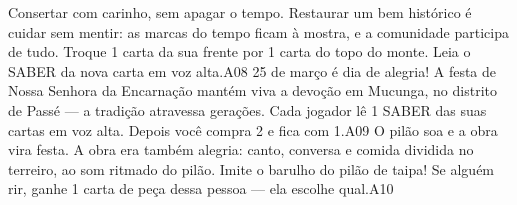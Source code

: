 \linhacartas
{
{Consertar com carinho, sem apagar o tempo.}
{Restaurar um bem histórico é cuidar sem mentir: as marcas do tempo ficam à mostra, e a comunidade participa de tudo.}
{Troque 1 carta da sua frente por 1 carta do topo do monte. Leia o SABER da nova carta em voz alta.}{A08}{}{}}
{
{25 de março é dia de alegria!}
{A festa de Nossa Senhora da Encarnação mantém viva a devoção em Mucunga, no distrito de Passé --- a tradição atravessa gerações.}
{Cada jogador lê 1 SABER das suas cartas em voz alta. Depois você compra 2 e fica com 1.}{A09}{}{}}
{
{O pilão soa e a obra vira festa.}
{A obra era também alegria: canto, conversa e comida dividida no terreiro, ao som ritmado do pilão.}
{Imite o barulho do pilão de taipa! Se alguém rir, ganhe 1 carta de peça dessa pessoa --- ela escolhe qual.}{A10}{}{}}
\newpage

\linhaversos
\linhaversos
\linhaversos
\newpage
\linhaversos
\linhaversos
\linhaversos
\newpage
\linhaversos
\linhaversos
\linhaversos
\newpage
\linhaversos
\linhaversos
\linhaversos
\newpage
\linhaversos
\linhaversos
\linhaversos
\newpage
\linhaversos
\linhaversos
\linhaversos


